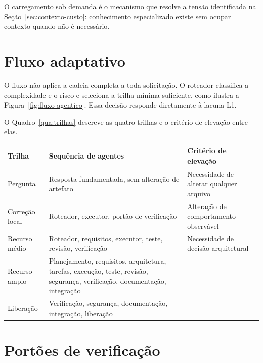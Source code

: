 O carregamento sob demanda é o mecanismo que resolve a tensão identificada na
Seção~\ref{sec:contexto-custo}: conhecimento especializado existe sem ocupar
contexto quando não é necessário.

\section{Fluxo adaptativo}
\label{sec:fw-fluxo}

O fluxo não aplica a cadeia completa a toda solicitação. O roteador classifica a
complexidade e o risco e seleciona a trilha mínima suficiente, como ilustra a
Figura~\ref{fig:fluxo-agentico}. Essa decisão responde diretamente à lacuna L1.



O Quadro~\ref{qua:trilhas} descreve as quatro trilhas e o critério de elevação
entre elas.

\begin{quadro}[htb]
	\caption{Trilhas do fluxo adaptativo e critério de elevação}
	\label{qua:trilhas}
	\centering
	\footnotesize
	\begin{tabularx}{\textwidth}{@{}p{2.2cm} X p{3.4cm}@{}}
		\toprule
		\textbf{Trilha} & \textbf{Sequência de agentes} & \textbf{Critério de elevação} \\
		\midrule
		Pergunta & Resposta fundamentada, sem alteração de artefato & Necessidade de alterar qualquer arquivo \\
		\addlinespace
		Correção local & Roteador, executor, portão de verificação & Alteração de comportamento observável \\
		\addlinespace
		Recurso médio & Roteador, requisitos, executor, teste, revisão, verificação & Necessidade de decisão arquitetural \\
		\addlinespace
		Recurso amplo & Planejamento, requisitos, arquitetura, tarefas, execução, teste, revisão, segurança, verificação, documentação, integração & --- \\
		\addlinespace
		Liberação & Verificação, segurança, documentação, integração, liberação & --- \\
		\bottomrule
	\end{tabularx}
\end{quadro}

\section{Portões de verificação}
\label{sec:fw-gates}

